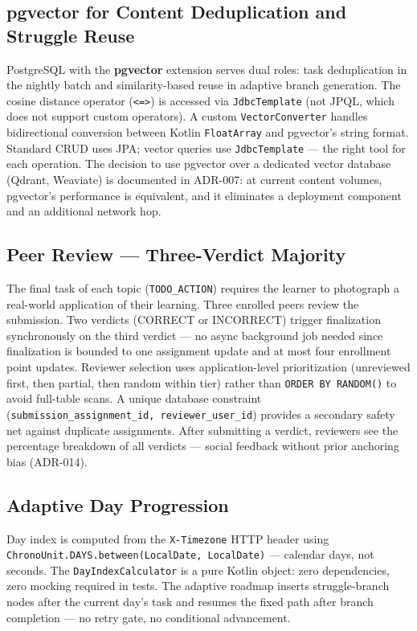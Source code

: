 \subsection{pgvector for Content Deduplication and Struggle Reuse}
\label{ssec:pgvector_impl}

PostgreSQL with the \textbf{pgvector} extension serves dual roles: task deduplication in the nightly batch and similarity-based reuse in adaptive branch generation. The cosine distance operator (\texttt{<=>}) is accessed via \texttt{JdbcTemplate} (not JPQL, which does not support custom operators). A custom \texttt{VectorConverter} handles bidirectional conversion between Kotlin \texttt{FloatArray} and pgvector's string format. Standard CRUD uses JPA; vector queries use \texttt{JdbcTemplate} — the right tool for each operation. The decision to use pgvector over a dedicated vector database (Qdrant, Weaviate) is documented in ADR-007: at current content volumes, pgvector's performance is equivalent, and it eliminates a deployment component and an additional network hop.

\subsection{Peer Review — Three-Verdict Majority}
\label{ssec:peer_review_impl}

The final task of each topic (\texttt{TODO\_ACTION}) requires the learner to photograph a real-world application of their learning. Three enrolled peers review the submission. Two verdicts (CORRECT or INCORRECT) trigger finalization synchronously on the third verdict — no async background job needed since finalization is bounded to one assignment update and at most four enrollment point updates. Reviewer selection uses application-level prioritization (unreviewed first, then partial, then random within tier) rather than \texttt{ORDER BY RANDOM()} to avoid full-table scans. A unique database constraint (\texttt{submission\_assignment\_id, reviewer\_user\_id}) provides a secondary safety net against duplicate assignments. After submitting a verdict, reviewers see the percentage breakdown of all verdicts — social feedback without prior anchoring bias (ADR-014).

\subsection{Adaptive Day Progression}
\label{ssec:day_impl}

Day index is computed from the \texttt{X-Timezone} HTTP header using \texttt{ChronoUnit.DAYS.between(LocalDate, LocalDate)} — calendar days, not seconds. The \texttt{DayIndexCalculator} is a pure Kotlin object: zero dependencies, zero mocking required in tests. The adaptive roadmap inserts struggle-branch nodes after the current day's task and resumes the fixed path after branch completion — no retry gate, no conditional advancement.

